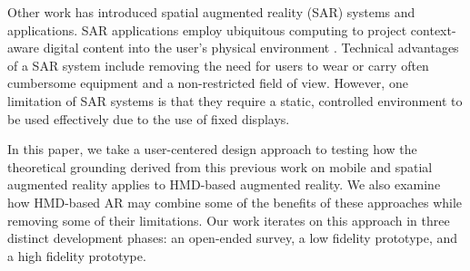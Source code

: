 Other work has introduced spatial augmented reality (SAR) systems and applications.  SAR applications employ ubiquitous computing to project context-aware digital content into the user's physical environment \cite{benko2015fovear,benko2014dyadic}.  Technical advantages of a SAR system include removing the need for users to wear or carry often cumbersome equipment and a non-restricted field of view.   %
However, one limitation of SAR systems is that they require a static, controlled environment to be used effectively due to the use of fixed displays. 

In this paper, we take a user-centered design approach to testing how the theoretical grounding derived from this previous work on mobile and spatial augmented reality applies to HMD-based augmented reality.  We also examine how HMD-based AR may combine some of the benefits of these approaches while removing some of their limitations. Our work iterates on this approach in three distinct development phases: an open-ended survey, a low fidelity prototype, and a high fidelity prototype. 